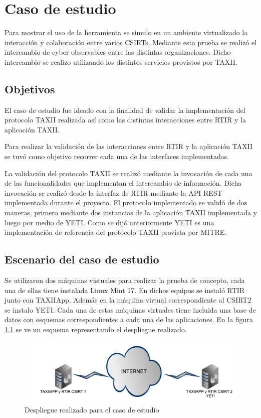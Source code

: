 \chapter{Caso de estudio}
\label{capitulo6}
Para mostrar el uso de la herramienta se simulo en un ambiente virtualizado la interacción y colaboración entre varios CSIRTs. Mediante esta prueba se realizó el intercambio de cyber observables entre las distintas organizaciones. Dicho intercambio se realizo utilizando los distintos servicios provistos por TAXII.

\section{Objetivos}

El caso de estudio fue ideado con la finalidad de validar la implementación del protocolo TAXII realizada así como las distintas interacciones entre RTIR y la aplicación TAXII. 

Para realizar la validación de las interacciones entre RTIR y la aplicación TAXII se tuvó como objetivo recorrer cada una de las interfaces implementadas.

La validación del protocolo TAXII se realizó mediante la invocación de cada una de las funcionalidades que implementan el intercambio de información. Dicha invocación se realizó desde la interfaz de RTIR mediante la API REST implementada durante el proyecto. El protocolo implementado se validó de dos maneras, primero mediante dos instancias de la aplicación TAXII implementada y luego por medio de YETI. Como se dijó anteriormente YETI es una implementación de referencia del protocolo TAXII provista por MITRE.

\section{Escenario del caso de estudio}
Se utilizaron dos máquinas vistuales para realizar la prueba de concepto, cada una de ellas tiene instalada Linux Mint 17. En dichos equipos se instaló RTIR junto con TAXIIApp. Además en la máquina virtual correspondiente al CSIRT2 se instalo YETI. Cada una de estas máquinas virtuales tiene incluida una base de datos con esquemas correspondientes a cada una de las aplicaciones. En la figura \ref{fig.laboratorio_desplegado} se ve un esquema representando el despliegue realizado.

\begin{figure}[h!]
	\label{fig.laboratorio_desplegado}
	\centering
	\includegraphics[scale=0.4]{caso-de-estudio/laboratorioDesplegado.png}
	\caption{Despliegue realizado para el caso de estudio}
\end{figure}

